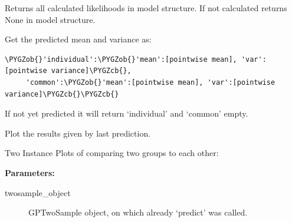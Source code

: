 \documentclass[letterpaper,10pt,english]{sphinxmanual}
\def\PYGZob{\char`\{}
\def\PYGZcb{\char`\}}
\begin{document}
\begin{fulllineitems}
\begin{fulllineitems}
\end{fulllineitems}


\begin{fulllineitems}
\label{base:gptwosample.twosample.twosample_base.TwoSampleBase.get_model_likelihoods}
Returns all calculated likelihoods in model structure. If not calculated returns None in model structure.

\end{fulllineitems}


\begin{fulllineitems}
\label{base:gptwosample.twosample.twosample_base.TwoSampleBase.get_predicted_mean_variance}
Get the predicted mean and variance as:

\begin{Verbatim}[commandchars=\\\{\}]
\PYGZob{}'individual':\PYGZob{}'mean':[pointwise mean], 'var':[pointwise variance]\PYGZcb{},
     'common':\PYGZob{}'mean':[pointwise mean], 'var':[pointwise variance]\PYGZcb{}\PYGZcb{}
\end{Verbatim}

If not yet predicted it will return `individual' and `common' empty.

\end{fulllineitems}


\begin{fulllineitems}
\label{base:gptwosample.twosample.twosample_base.TwoSampleBase.plot}
Plot the results given by last prediction.

Two Instance Plots of comparing two groups to each other:

\textbf{Parameters:}
\begin{description}
\item[{twosample\_object}] \leavevmode{[}\code{gptwosample.twosample}{]}
GPTwoSample object, on which already `predict' was called.


\end{description}
\end{fulllineitems}
\end{fulllineitems}
\end{document}
